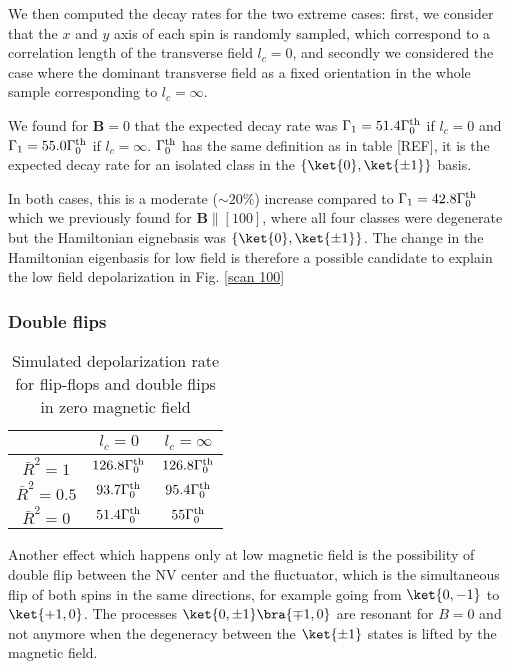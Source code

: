 \documentclass[a4paper,11pt]{report}
\begin{document}
\begin{refsection}
We then computed the decay rates for the two extreme cases: first, we consider that the $x$ and $y$ axis of each spin is randomly sampled, which correspond to a correlation length of the transverse field $l_c=0$, and secondly we considered the case where the dominant transverse field as a fixed orientation in the whole sample corresponding to $l_c=\infty$.

We found for $\mathbf{B}=0$ that the expected decay rate was $\Gamma_1=51.4 \Gamma_0^{\rm th}$ if $l_c=0$ and $\Gamma_1=55.0 \Gamma_0^{\rm th}$ if $l_c=\infty$. $\Gamma_0^{\rm th}$ has the same definition as in table [REF], it is the expected decay rate for an isolated class in the $\{ \ket{0}, \ket{\pm 1} \}$ basis.

In both cases, this is a moderate ($\sim 20 \%$) increase compared to $\Gamma_1=42.8 \Gamma_0^{\rm th}$ which we previously found for $\mathbf{B} \parallel [100]$, where all four classes were degenerate but the Hamiltonian eignebasis was $\{ \ket{0}, \ket{\pm 1} \}$. The change in the Hamiltonian eigenbasis for low field is therefore a possible candidate to explain the low field depolarization in Fig. \ref{scan 100}

\subsubsection{Double flips}

\begin{table}[htbp]
\centering
\caption{Simulated depolarization rate for flip-flops and double flips in zero magnetic field}
 \label{table double flips}
\begin{tabular}{c|cc}
{} & $l_c=0$ & $l_c=\infty$ \\
\midrule
$\bar{R}^2=1$ & $126.8 \Gamma_0^{\rm th}$ & $126.8 \Gamma_0^{\rm th}$ \\
$\bar{R}^2=0.5$ & $93.7 \Gamma_0^{\rm th}$ & $95.4 \Gamma_0^{\rm th}$ \\
$\bar{R}^2=0$ & $51.4 \Gamma_0^{\rm th}$ & $55 \Gamma_0^{\rm th}$ \\
\end{tabular}
\end{table}

Another effect which happens only at low magnetic field is the possibility of double flip between the NV center and the fluctuator, which is the simultaneous flip of both spins in the same directions, for example going from $\ket{0,-1}$ to $\ket{+1,0}$. The processes $\ket{0, \pm 1}\bra{\mp 1,0}$ are resonant for $B=0$ and not anymore when the degeneracy between the $\ket{\pm 1}$ states is lifted by the magnetic field.


\end{refsection}
\end{document}

